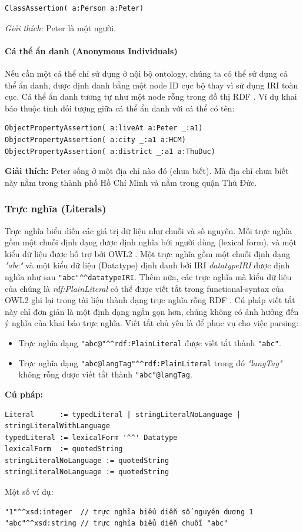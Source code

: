 \begin{verbatim}
ClassAssertion( a:Person a:Peter)
\end{verbatim}

\textit{Giải thích:} Peter là một người.

\paragraph{Cá thể ẩn danh (Anonymous Individuals)} Nếu cần một cá thể chỉ sử dụng ở nội bộ ontology, chúng ta có thể sử dụng cá thể ẩn danh, được định danh bằng một node ID cục bộ thay vì sử dụng IRI toàn cục. Cá thể ẩn danh tương tự như một node rỗng trong đồ thị RDF \cite{rdf_concept}. Ví dụ khai báo thuộc tính đối tượng giữa cá thể ẩn danh với cá thể có tên:

\begin{verbatim}
ObjectPropertyAssertion( a:liveAt a:Peter _:a1)
ObjectPropertyAssertion( a:city _:a1 a:HCM)
ObjectPropertyAssertion( a:district _:a1 a:ThuDuc)
\end{verbatim}

\textbf{Giải thích:} Peter sống ở một địa chỉ nào đó (chưa biết). Mà địa chỉ chưa biết này nằm trong thành phố Hồ Chí Minh và nằm trong quận Thủ Đức.

\subsubsection{Trực nghĩa (Literals)}
Trực nghĩa biểu diễn các giá trị dữ liệu như chuỗi và số nguyên. Mỗi trực nghĩa gồm một chuỗi định dạng được định nghĩa bới người dùng (lexical form), và một kiểu dữ liệu được hỗ trợ bởi OWL2 \cite{owl2spec} . Một trực nghĩa gồm một chuỗi định dạng \textit{"abc"} và một kiểu dữ liệu (Datatype) định danh bởi IRI \textit{datatypeIRI} được định nghĩa như sau \verb|"abc"^^datatypeIRI|. Thêm nữa, các trực nghĩa mà kiểu dữ liệu của chúng là \textit{rdf:PlainLiteral} có thể được viết tắt trong functional-syntax của OWL2 ghi lại trong tài liệu thành dạng trực nghĩa rỗng RDF \cite{rdf_concept}. Cú pháp viết tắt này chỉ đơn giản là một định dạng ngắn gọn hơn, chúng không có ảnh hưởng đến ý nghĩa của khai báo trực nghĩa. Viết tắt chủ yếu là để phục vụ cho việc parsing:
\begin{itemize}
\item Trực nghĩa dạng \verb|"abc@"^^rdf:PlainLiteral| được viết tắt thành \verb|"abc"|.
\item Trực nghĩa dạng \verb|"abc@langTag"^^rdf:PlainLiteral| trong đó \textit{"langTag"} không rỗng được viết tắt thành \verb|"abc"@langTag|.
\end{itemize}
\textbf{Cú pháp:}
\begin{verbatim}
Literal      := typedLiteral | stringLiteralNoLanguage | stringLiteralWithLanguage
typedLiteral := lexicalForm '^^' Datatype
lexicalForm  := quotedString
stringLiteralNoLanguage := quotedString
stringLiteralNoLanguage := quotedString
\end{verbatim}
Một số ví dụ:
\begin{verbatim}
"1"^^xsd:integer  // trực nghĩa biểu diễn số nguyên dương 1
"abc"^^xsd:string // trực nghĩa biểu diễn chuỗi "abc"
\end{verbatim}

